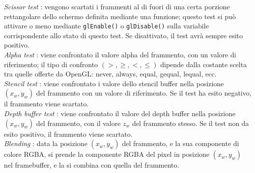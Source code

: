 \emph{Scissor test} : vengono scartati i frammenti al di fuori di una certa porzione rettangolare dello schermo definita mediante una funzione; questo test si può attivare o meno mediante \texttt{glEnable()} o \texttt{glDisable()} sulla variabile corrispondente allo stato di questo test. Se disattivato, il test avrà sempre esito positivo.
\\

\emph{Alpha test} : viene confrontato il valore alpha del frammento, con un valore di riferimento; il tipo di confronto $(>,\geq,<,\leq)$ dipende dalla costante scelta tra quelle offerte da OpenGL: never, always, equal, gequal, lequal, ecc.
\\

\emph{Stencil test} : viene confrontato i valore dello stencil buffer nella posizione $(x_w,y_w)$ del frammento con un valore di riferimento. Se il test ha esito negativo, il frammento viene scartato.
\\

\emph{Depth buffer test} : viene confrontato il valore del depth buffer nella posizione $(x_w,y_w)$ del frammento, con il valore $z_w$ del frammento stesso. Se il test non da esito positivo, il frammento viene scartato.
\\

\emph{Blending} : data la posizione $(x_w,y_w)$ del frammento, e la sua componente di colore RGBA, si prende la componente RGBA del pixel in posizione $(x_w,y_w)$ nel framebuffer, e la si combina con quella del frammento.
\\

